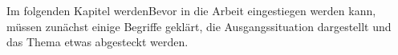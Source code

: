 Im folgenden Kapitel werdenBevor in die Arbeit eingestiegen werden kann, müssen zunächst einige Begriffe geklärt, die Ausgangssituation dargestellt und das Thema etwas abgesteckt werden.









